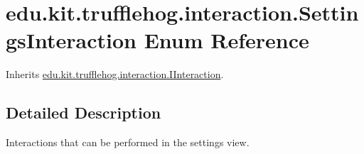 \hypertarget{enumedu_1_1kit_1_1trufflehog_1_1interaction_1_1_settings_interaction}{}\section{edu.\+kit.\+trufflehog.\+interaction.\+Settings\+Interaction Enum Reference}
\label{enumedu_1_1kit_1_1trufflehog_1_1interaction_1_1_settings_interaction}


Inherits \hyperlink{interfaceedu_1_1kit_1_1trufflehog_1_1interaction_1_1_i_interaction}{edu.\+kit.\+trufflehog.\+interaction.\+I\+Interaction}.



\subsection{Detailed Description}
Interactions that can be performed in the settings view. 